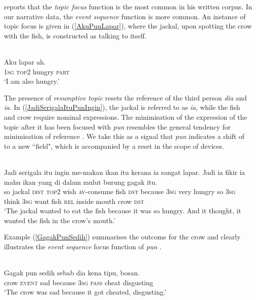 \documentclass[output=paper
,modfonts
,nonflat]{langsci/langscibook}
\begin{document}
\noindent
\cite[54]{Goddard2001} reports that the \emph{topic focus} function is the most common in his written  corpus. In our narrative data, the \emph{event sequence} function is more common. An instance of topic focus is given in (\ref{AkuPunLapar}), where the jackal, upon spotting the crow with the fish, is constructed as talking to itself.

\ea\label{AkuPunLapar} 
\\
\gll 	 {\ob}Aku   lapar  ah.\\
	\textsc{1sg} \textsc{top2} hungry \textsc{part}\\
\glt `I am also hungry.'
\z

\noindent
The presence of \emph{resumptive topic} resets the reference of the third person  \emph{dia} and \emph{ia}. In (\ref{JadiSerigalaItuPunIngin}), the jackal is referred to as \emph{ia}, while the fish and crow require nominal expressions. The minimisation of the expression of the topic after it has been focused with \emph{pun} resembles the general tendency for minimisation of reference \citep{Heritage2007, SacksSchegloff2007}. We take this as a signal that \emph{pun} indicates a shift of  to a new ``field", which is accompanied by a reset in the scope of  devices. 

\ea\label{JadiSerigalaItuPunIngin} 
\\
\gll 	Jadi {\ob}serigala itu   ingin me-makan ikan itu kerana   {\ob}ia{\cb}  sangat lapar. Jadi  {\ob}ia{\cb}  fikir  {\ob}ia{\cb}  mahu ikan yang {di dalam} mulut {burung gagak} itu.\\
		so   jackal    \textsc{dist} \textsc{top2} wish  \textsc{av-}consume fish \textsc{dst} because \textsc{3sg} very   hungry so   \textsc{3sg} think \textsc{3sg} want fish \textsc{rel}  inside   mouth crow         \textsc{dst}\\
	\glt `The jackal wanted to eat the fish because it was so hungry. And it thought, it wanted the fish in the crow's mouth.'
\z

\noindent
Example (\ref{GagakPunSedih}) summarises the outcome for the crow and clearly illustrates the \emph{event sequence} focus function of \emph{pun} \citep[cf.][38]{Goddard2001}.

\ea\label{GagakPunSedih} 
\\
\gll 	 {\ob}Gagak pun{\cb}  sedih sebab   dia kena tipu, bosan.\\
crow \textsc{event} sad   because \textsc{3sg} \textsc{pass} cheat      disgusting\\
\glt `The crow was sad because it got cheated, disgusting.'
\z
\end{document}
